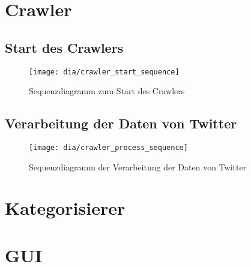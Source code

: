 \section{Crawler}

\subsection{Start des Crawlers}

\begin{figure}[p]
\texttt{[image: dia/crawler\_start\_sequence]}
\caption{Sequenzdiagramm zum Start des Crawlers}
\end{figure}

\subsection{Verarbeitung der Daten von Twitter}

\begin{figure}[p]
\texttt{[image: dia/crawler\_process\_sequence]}
\caption{Sequenzdiagramm der Verarbeitung der Daten von Twitter}
\end{figure}

\section{Kategorisierer}

\section{GUI}